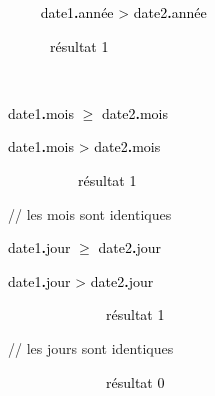 {\sffamily
\textcolor{black}{\ \ \ \ }\textstyleMotCl{\textcolor{black}{si}}\textcolor{black}{
date1}\textbf{\textcolor{black}{.}}\textcolor{black}{année
{\textgreater}
date2}\textbf{\textcolor{black}{.}}\textcolor{black}{année
}\textstyleMotCl{\textcolor{black}{alors}}}

{\sffamily
\textcolor{black}{\ \ \ \ \ \ résultat
}\textstyleMotCl{{\textcolor{black}{←}}}\textcolor{black}{
1}}

{\sffamily
\ \ \ \ }

{\sffamily
\textstyleMotCl{\textcolor{black}{\ \ \ \ \ \ si}}\textcolor{black}{
date1}\textbf{\textcolor{black}{.}}\textcolor{black}{mois
}\textrm{\textcolor{black}{${\geq}$}}\textcolor{black}{
date2}\textbf{\textcolor{black}{.}}\textcolor{black}{mois
}\textstyleMotCl{\textcolor{black}{alors}}}

{\sffamily
\textstyleMotCl{\textcolor{black}{\ \ \ \ \ \ \ \ si}}\textcolor{black}{
date1}\textbf{\textcolor{black}{.}}\textcolor{black}{mois
{\textgreater}
date2}\textbf{\textcolor{black}{.}}\textcolor{black}{mois
}\textstyleMotCl{\textcolor{black}{alors}}}

{\sffamily
\textcolor{black}{\ \ \ \ \ \ \ \ \ \ résultat
}\textstyleMotCl{{\textcolor{black}{←}}}\textcolor{black}{
1}}

{\sffamily
{} // les mois sont identiques}

{\sffamily
\textstyleMotCl{\textcolor{black}{\ \ \ \ \ \ \ \ \ \ si}}\textcolor{black}{
date1}\textbf{\textcolor{black}{.}}\textcolor{black}{jour
}\textrm{\textcolor{black}{${\geq}$}}\textcolor{black}{
date2}\textbf{\textcolor{black}{.}}\textcolor{black}{jour
}\textstyleMotCl{\textcolor{black}{alors}}}

{\sffamily
\textstyleMotCl{\textcolor{black}{\ \ \ \ \ \ \ \ \ \ \ \ si}}\textcolor{black}{
date1}\textbf{\textcolor{black}{.}}\textcolor{black}{jour
{\textgreater}
date2}\textbf{\textcolor{black}{.}}\textcolor{black}{jour
}\textstyleMotCl{\textcolor{black}{alors}}}

{\sffamily
\textcolor{black}{\ \ \ \ \ \ \ \ \ \ \ \ \ \ résultat
}\textstyleMotCl{{\textcolor{black}{←}}}\textcolor{black}{
1}}

{\sffamily
{} // les jours sont
identiques}

{\sffamily
\textcolor{black}{\ \ \ \ \ \ \ \ \ \ \ \ \ \ résultat
}\textstyleMotCl{{\textcolor{black}{←}}}\textcolor{black}{
0}}

